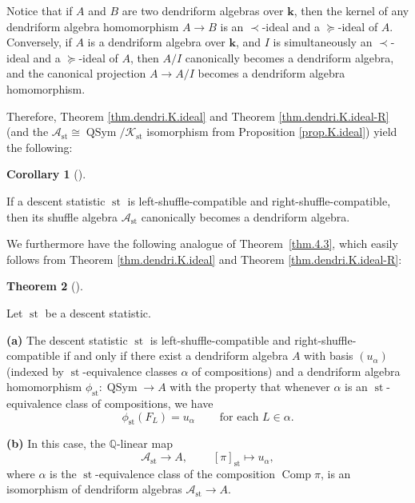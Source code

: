 \documentclass[numbers=enddot,12pt,final,onecolumn,notitlepage]{scrartcl}%
\theoremstyle{definition}
\newtheorem{theo}{Theorem}[section]
\newenvironment{theorem}[1][]
{\begin{theo}[#1]\begin{leftbar}}
{\end{leftbar}\end{theo}}
\newtheorem{coro}[theo]{Corollary}
\newenvironment{corollary}[1][]
{\begin{coro}[#1]\begin{leftbar}}
{\end{leftbar}\end{coro}}
\newenvironment{verlong}{}{}
\begin{document}
\begin{verlong}
Notice that if $A$ and $B$ are two dendriform algebras over $\mathbf{k}$, then
the kernel of any dendriform algebra homomorphism $A\rightarrow B$ is an
$\left.  \prec\right.  $-ideal and a $\left.  \succeq\right.  $-ideal of $A$.
Conversely, if $A$ is a dendriform algebra over $\mathbf{k}$, and $I$ is
simultaneously an $\left.  \prec\right.  $-ideal and a $\left.  \succeq
\right.  $-ideal of $A$, then $A/I$ canonically becomes a dendriform algebra,
and the canonical projection $A\rightarrow A/I$ becomes a dendriform algebra homomorphism.

Therefore, Theorem \ref{thm.dendri.K.ideal} and Theorem
\ref{thm.dendri.K.ideal-R} (and the $\mathcal{A}_{\operatorname*{st}}%
\cong\operatorname*{QSym}/\mathcal{K}_{\operatorname*{st}}$ isomorphism from
Proposition \ref{prop.K.ideal}) yield the following:

\begin{corollary}
\label{cor.dendri.quotient-dendri}If a descent statistic $\operatorname*{st}$
is left-shuffle-compatible and right-shuffle-compatible, then its shuffle
algebra $\mathcal{A}_{\operatorname*{st}}$ canonically becomes a dendriform algebra.
\end{corollary}

We furthermore have the following analogue of Theorem~\ref{thm.4.3}, which
easily follows from Theorem \ref{thm.dendri.K.ideal} and Theorem
\ref{thm.dendri.K.ideal-R}:

\begin{theorem}
\label{thm.dendri.4.3}Let $\operatorname*{st}$ be a descent statistic.

\textbf{(a)} The descent statistic $\operatorname*{st}$ is
left-shuffle-compatible and right-shuffle-compatible if and only if there
exist a dendriform algebra $A$ with
basis $\left(  u_{\alpha}\right)  $ (indexed by $\operatorname*{st}%
$-equivalence classes $\alpha$ of compositions)
and a dendriform algebra homomorphism
$\phi_{\operatorname*{st}}:\operatorname*{QSym} \rightarrow A$
with the property that whenever $\alpha$ is an
$\operatorname{st}$-equivalence class of compositions, we have
\[
\phi_{\operatorname*{st}}\left(  F_{L}\right)  =u_{\alpha}%
\ \ \ \ \ \ \ \ \ \ \text{for each }L\in\alpha.
\]

\textbf{(b)} In this case, the $\mathbb{Q}$-linear map%
\[
\mathcal{A}_{\operatorname*{st}}\rightarrow A,\ \ \ \ \ \ \ \ \ \ \left[
\pi\right]  _{\operatorname*{st}}\mapsto u_{\alpha},
\]
where $\alpha$ is the $\operatorname*{st}$-equivalence class of the
composition $\operatorname*{Comp}\pi$, is an isomorphism of dendriform
algebras $\mathcal{A}_{\operatorname*{st}}\rightarrow A$.
\end{theorem}


\end{verlong}
\end{document}
